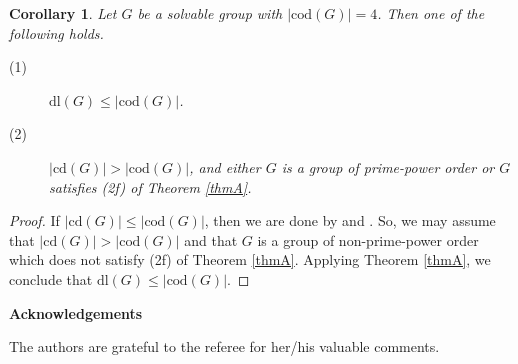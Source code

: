 \documentclass[9pt]{article}
\makeatletter
\newtheorem{cor}[lem]{\bf Corollary}
\newcommand{\ackname}{Acknowledgements}
\newenvironment{acknowledgement}{%
    \titlepage
    \null\vfil
    \@beginparpenalty\@lowpenalty
    \begin{center}%
      \bfseries \ackname
      \@endparpenalty\@M
    \end{center}}%
  {\par\vfil\null\endtitlepage}
\newenvironment{acknowledgement}{%
    \if@twocolumn
      \section*{\ackname}%
    \else
      \small
      \begin{center}%
        {\bfseries \ackname\vspace{-0.5em}\vspace{\z@}}%
      \end{center}%
      \quotation
    \fi}
    {\if@twocolumn\else\endquotation\fi}
\makeatother
\begin{document}
\begin{cor}
	Let $G$ be a solvable group with $|\mathrm{cod}(G)|=4$.
	Then one of the following holds.
	\begin{description}
		\item[(1)] $\mathrm{dl}(G)\leq |\mathrm{cod}(G)|$.
		\item[(2)] $|\mathrm{cd}(G)|>|\mathrm{cod}(G)|$, and 
		either $G$ is a group of prime-power order or $G$ satisfies (2f) of Theorem \ref{thmA}.
	\end{description}
\end{cor}
 \begin{proof}
     If $|\mathrm{cd}(G)|\leq |\mathrm{cod}(G)|$, then we are done by \cite[Theorem 12.15]{isaacs1994} and \cite{garrison}.
	 So, we may assume that $|\mathrm{cd}(G)|>|\mathrm{cod}(G)|$ and that $G$ is a group of non-prime-power order 
	 which does not satisfy (2f) of Theorem \ref{thmA}.
	 Applying Theorem \ref{thmA}, we conclude that $\mathrm{dl}(G)\leq |\mathrm{cod}(G)|$.
 \end{proof}

	
\begin{acknowledgement}
	The authors are grateful to the referee for her/his
 valuable comments.
\end{acknowledgement}
\end{document}
